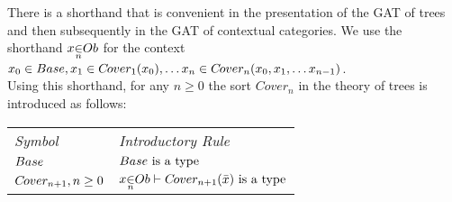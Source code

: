\newcommand{\genericOb}{Ob} %

There is a  shorthand that is convenient in the presentation  of the GAT of trees  and then subsequently in the GAT of contextual categories. We use the shorthand
$\ofTn{x}{n}{\genericOb}$ for the context $x_0 \in Base,x_1 \in C\kern-1pt over_{1}(x_0), \hdots x_n \in C\kern-1pt over_{n}(x_0,x_1,\hdots x_{n-1}) $. \\

\noindent Using this shorthand, for any $n \geq 0$ the sort $Cover_{n}$  in the theory of trees is introduced as follows: \\

\vspace{0.03cm} 
\begin{tabular}{>{\itshape}l l}
Symbol & \itshape{Introductory Rule} \\
$Base  $     & $Base\mbox{ is a type}$\\
$C\kern-1pt over_{n+1}, n \geq 0 $ & $\ofTn{x}{n}{\genericOb}    \tstyle \isT{\Si{n+1}(\bar{x})} $\\
\end{tabular} \\
\vspace{.1cm}  \\

